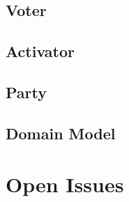 \documentclass[11pt]{article}
\begin{document}
	\subsection{Voter}
		
		
	\subsection{Activator}
		
		
	\subsection{Party}
		
	
	\subsection{Domain Model}
		
	
	\section{Open Issues}
		
	
\end{document}
